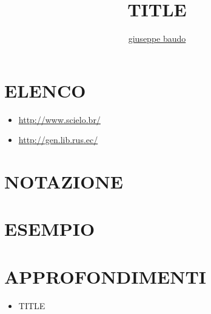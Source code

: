 \documentclass[a4paper,10pt]{article}
\title{TITLE}
\author{\href{http://www.baudo.hol.es}{giuseppe baudo}}
\begin{document}
\maketitle

\section{ELENCO}
\begin{itemize}
 \item \url{http://www.scielo.br/}
 \item \url{http://gen.lib.rus.ec/}
\end{itemize}


\section{NOTAZIONE}

\section{ESEMPIO}

\section{APPROFONDIMENTI}
\begin{itemize}
 \item TITLE
\end{itemize}
\end{document}
